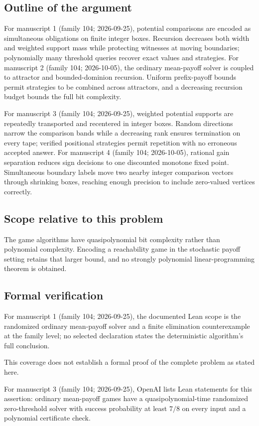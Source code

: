 \documentclass[11pt]{article}
\begin{document}
\subsection{Outline of the argument}
For manuscript 1 (family 104; 2026-09-25), potential comparisons are encoded as simultaneous obligations on finite integer boxes. Recursion decreases both width and weighted support mass while protecting witnesses at moving boundaries; polynomially many threshold queries recover exact values and strategies. For manuscript 2 (family 104; 2026-10-05), the ordinary mean-payoff solver is coupled to attractor and bounded-dominion recursion. Uniform prefix-payoff bounds permit strategies to be combined across attractors, and a decreasing recursion budget bounds the full bit complexity.

For manuscript 3 (family 104; 2026-09-25), weighted potential supports are repeatedly transported and recentered in integer boxes. Random directions narrow the comparison bands while a decreasing rank ensures termination on every tape; verified positional strategies permit repetition with no erroneous accepted answer. For manuscript 4 (family 104; 2026-10-05), rational gain separation reduces sign decisions to one discounted monotone fixed point. Simultaneous boundary labels move two nearby integer comparison vectors through shrinking boxes, reaching enough precision to include zero-valued vertices correctly.

\subsection{Scope relative to this problem}
The game algorithms have quasipolynomial bit complexity rather than polynomial complexity. Encoding a reachability game in the stochastic payoff setting retains that larger bound, and no strongly polynomial linear-programming theorem is obtained.

\subsection{Formal verification}
For manuscript 1 (family 104; 2026-09-25), the documented Lean scope is the randomized ordinary mean-payoff solver and a finite elimination counterexample at the family level; no selected declaration states the deterministic algorithm's full conclusion.

This coverage does not establish a formal proof of the complete problem as stated here.

For manuscript 3 (family 104; 2026-09-25), OpenAI lists Lean statements for this assertion: ordinary mean-payoff games have a quasipolynomial-time randomized zero-threshold solver with success probability at least $7/8$ on every input and a polynomial certificate check.
\end{document}
